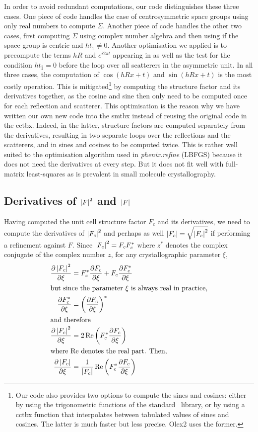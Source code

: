 \documentclass[pdf]{iucr}
\begin{document}
In order to avoid redundant computations, our code distinguishes these three cases. One piece of code handles the case of centrosymmetric space groups using only real numbers to compute $\Sigma$. Another piece of code handles the other two cases, first computing $\Sigma$ using complex number algebra and then using  if the space group is centric and $h t_{\bar{1}} \neq 0$. Another optimisation we applied is to precompute the terms $hR$ and $e^{i2\pi t}$ appearing in  as well as the test for the condition $h t_{\bar{1}}=0$ before the loop over all scatterers in the asymmetric unit. In all three cases, the computation of $\cos(hRx + t)$ and $\sin(hRx + t)$ is the most costly operation. This is mitigated\footnote{Our code also provides two options to compute the sines and cosines: either by using the trigonometric functions of the standard \cpp\ library, or by using a cctbx function that interpolates between tabulated values of sines and cosines. The latter is much faster but less precise. Olex2 uses the former.} by computing the structure factor and its derivatives together, as the cosine and sine then only need to be computed once for each reflection and scatterer.
This optimisation is the reason why we have written our own new code into the smtbx instead of reusing the original code in the cctbx. Indeed, in the latter, structure factors are computed separately from the derivatives, resulting in two separate loops over the reflections and the scatterers, and in sines and cosines to be computed twice. This is rather well suited to the optimisation algorithm used in \emph{phenix.refine} (LBFGS) because it does not need the derivatives at every step. But it does not fit well with full-matrix least-squares as is prevalent in small molecule crystallography.  

\subsection{Derivatives of $\left| F \right|^2$ and $\left| F \right|$}

Having computed the unit cell structure factor $F_c$ and its derivatives, we need to compute the derivatives of $\left| F_c \right|^2$ and perhaps as well $\left| F_c \right| = \sqrt{\left| F_c \right|^2}$ if performing a refinement against $F$. Since $\left| F_c \right|^2 = F_c F_c^*$ where $z^*$ denotes the complex conjugate of the complex number $z$, for any crystallographic parameter $\xi$,
\begin{align}
\frac{\partial \left| F_c \right|^2}{\partial \xi} &= F_c^* \frac{\partial F_c}{\partial \xi} + F_c \frac{\partial F_c^*}{\partial \xi} \nonumber \\
\intertext{but since the parameter $\xi$ is always real in practice,}
\frac{\partial F_c^*}{\partial \xi} &= \left( \frac{\partial F_c}{\partial \xi} \right)^* \\
\intertext{and therefore}
\frac{\partial \left| F_c \right|^2}{\partial \xi} &= 2\operatorname{Re}\left( F_c^* \frac{\partial F_c}{\partial \xi}\right) \\
\intertext{where $\operatorname{Re}$ denotes the real part. Then,}
\frac{\partial \left| F_c \right|}{\partial \xi} &= \frac{1}{\left| F_c \right|} \operatorname{Re}\left( F_c^* \frac{\partial F_c}{\partial \xi}\right)
\end{align}
\end{document}
